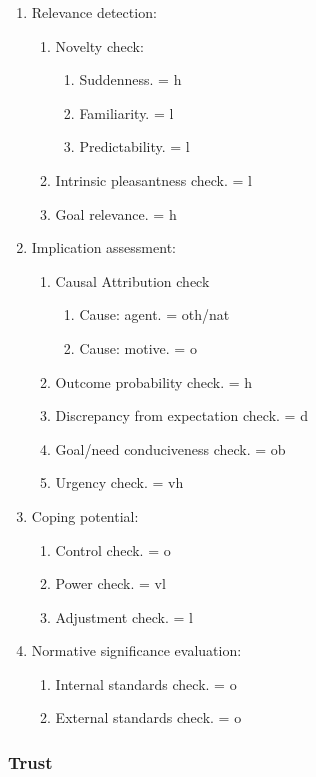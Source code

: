 \begin{enumerate}
 \item  Relevance detection:
 \begin{enumerate}
  \item  Novelty check:
  \begin{enumerate}
   \item  Suddenness. = h
   \item  Familiarity. = l
   \item  Predictability. = l
  \end{enumerate}
  \item  Intrinsic pleasantness check. = l
  \item  Goal relevance. = h
 \end{enumerate}
 \item  Implication assessment:
 \begin{enumerate}
  \item  Causal Attribution check
  \begin{enumerate}
   \item  Cause: agent. = oth/nat
   \item  Cause: motive. = o
  \end{enumerate}
  \item  Outcome probability check. = h
  \item  Discrepancy from expectation check. = d
  \item  Goal/need conduciveness check. = ob
  \item  Urgency check. = vh
 \end{enumerate}
 \item  Coping potential:
 \begin{enumerate}
  \item  Control check. = o
  \item  Power check. = vl
  \item  Adjustment check. = l
 \end{enumerate}
 \item  Normative significance evaluation:
 \begin{enumerate}
  \item  Internal standards check. = o
  \item  External standards check. = o
 \end{enumerate}
\end{enumerate}

\subsubsection{Trust}

